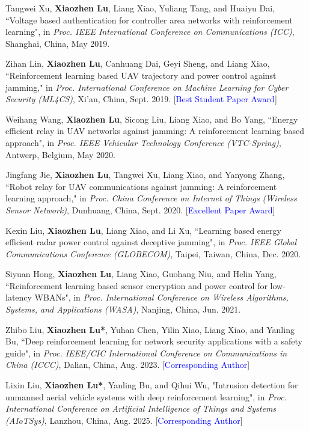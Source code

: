 \documentclass{article}
\begin{document}
\begin{justifying}
\begin{myreferences}
	\item Tangwei Xu, \textbf{Xiaozhen Lu}, Liang Xiao, Yuliang Tang, and Huaiyu Dai, ``Voltage based authentication for controller area networks with reinforcement learning", in \emph{Proc. IEEE International Conference on Communications (ICC)}, Shanghai, China, May 2019.
	\item Zihan Lin, \textbf{Xiaozhen Lu}, Canhuang Dai, Geyi Sheng, and Liang Xiao, ``Reinforcement learning based UAV trajectory and power control against jamming," in \emph{Proc. International Conference on Machine Learning for Cyber Security (ML4CS)}, Xi'an, China, Sept. 2019. [\textcolor{blue}{Best Student Paper Award}]
	\item Weihang Wang, \textbf{Xiaozhen Lu}, Sicong Liu, Liang Xiao, and Bo Yang, ``Energy efficient relay in UAV networks against jamming: A reinforcement learning based approach", in \emph{Proc. IEEE Vehicular Technology Conference (VTC-Spring)}, Antwerp, Belgium, May 2020.
	\item Jingfang Jie, \textbf{Xiaozhen Lu}, Tangwei Xu, Liang Xiao, and Yanyong Zhang, ``Robot relay for UAV communications against jamming: A reinforcement learning approach," in \emph{Proc. China Conference on Internet of Things (Wireless Sensor Network)}, Dunhuang, China, Sept. 2020. [\textcolor{blue}{Excellent Paper Award}]
	\item Kexin Liu, \textbf{Xiaozhen Lu}, Liang Xiao, and Li Xu, ``Learning based energy efficient radar power control against deceptive jamming", in \emph{Proc. IEEE Global Communications Conference (GLOBECOM)}, Taipei, Taiwan, China, Dec. 2020.
	\item Siyuan Hong, \textbf{Xiaozhen Lu}, Liang Xiao, Guohang Niu, and Helin Yang, ``Reinforcement learning based sensor encryption and power control for low-latency WBANs", in \emph{Proc. International Conference on Wireless Algorithms, Systems, and Applications (WASA)}, Nanjing, China, Jun. 2021.
	\item Zhibo Liu, \textbf{Xiaozhen Lu*}, Yuhan Chen, Yilin Xiao, Liang Xiao, and Yanling Bu, ``Deep reinforcement learning for network security applications with a safety guide", in \emph{Proc. IEEE/CIC International Conference on Communications in China (ICCC)}, Dalian, China, Aug. 2023. [\textcolor{blue}{Corresponding Author}]
	\item Lixin Liu, \textbf{Xiaozhen Lu*}, Yanling Bu, and Qihui Wu, "Intrusion detection for unmanned aerial vehicle systems with deep reinforcement learning", in \emph{Proc. International Conference on Artificial Intelligence of Things and Systems (AIoTSys)}, Lanzhou, China, Aug. 2025. [\textcolor{blue}{Corresponding Author}]

\end{myreferences}
\end{justifying}
\end{document}
